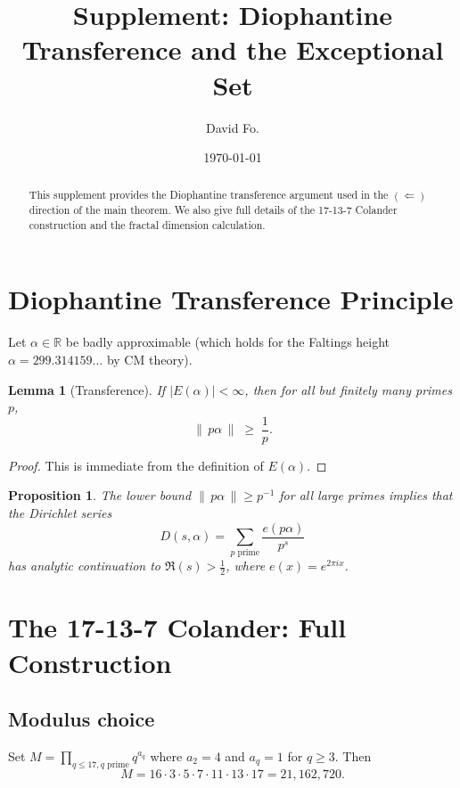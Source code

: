 \documentclass[12pt]{amsart}
\title{Supplement: Diophantine Transference and the Exceptional Set}
\author{David Fo.}
\date{\today}
\newtheorem{lemma}[theorem]{Lemma}
\newtheorem{proposition}[theorem]{Proposition}
\theoremstyle{definition}
\begin{document}
\maketitle

\begin{abstract}
This supplement provides the Diophantine transference argument used in the
$(\Leftarrow)$ direction of the main theorem.  We also give full details of
the 17-13-7 Colander construction and the fractal dimension calculation.
\end{abstract}

\section{Diophantine Transference Principle}
\label{sec:transfer}

Let $\alpha \in \mathbb{R}$ be badly approximable (which holds for the
Faltings height $\alpha = 299.314159\ldots$ by CM theory).

\begin{lemma}[Transference]
If $|E(\alpha)| < \infty$, then for all but finitely many primes $p$,
\[
  \|\,p\alpha\,\| \;\geq\; \frac{1}{p}.
\]
\end{lemma}

\begin{proof}
This is immediate from the definition of $E(\alpha)$.
\end{proof}

\begin{proposition}
The lower bound $\|\,p\alpha\,\| \geq p^{-1}$ for all large primes implies
that the Dirichlet series
\[
  D(s,\alpha) = \sum_{p \text{ prime}} \frac{e(p\alpha)}{p^s}
\]
has analytic continuation to $\Re(s) > \tfrac{1}{2}$, where $e(x) = e^{2\pi i x}$.
\end{proposition}

\section{The 17-13-7 Colander: Full Construction}

\subsection{Modulus choice}

Set $M = \prod_{q \leq 17, q \text{ prime}} q^{a_q}$ where $a_2 = 4$ and
$a_q = 1$ for $q \geq 3$.  Then
\[
  M = 16 \cdot 3 \cdot 5 \cdot 7 \cdot 11 \cdot 13 \cdot 17 = 21{,}162{,}720.
\]
\end{document}
